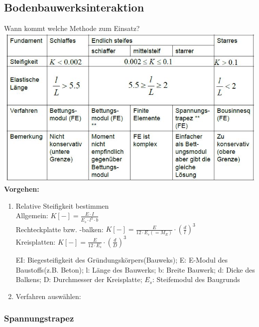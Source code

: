 \begin{multicols}{2}


	\subsection{Bodenbauwerksinteraktion}
	Wann kommt welche Methode zum Einsatz?\\
	\includegraphics[width=1.0\linewidth]{images/Verfahren}\\
	\textbf{Vorgehen:}\\
	\begin{enumerate}
		\item Relative
		Steifigkeit bestimmen\\
		Allgemein: $K[-]=\frac{E\cdot I}{E_s\cdot l^3\cdot b}$\\
		Rechteckplatte bzw. -balken:
		$K[-]=\frac{E}{12\cdot E_s (=M_E)}\cdot (\frac{d}{l})^3$ \\
		Kreisplatten: $K[-]=\frac{E}{12\cdot E_s}\cdot(\frac{d}{D})^3$\\
		\begin{tiny}
			
			EI: Biegesteifigkeit des Gründungskörpers(Bauweks); E: E-Modul des Baustoffs(z.B. Beton); l: Länge des Bauwerks; b: Breite Bauwerk; d: Dicke des Balkens; D: Durchmesser der Kreisplatte; $E_s$: Steifemodul des Baugrunds
		\end{tiny}	
		\item 
		Verfahren auswählen:

		
	\end{enumerate}


	\subsubsection{Spannungstrapez}
	

\end{multicols}
